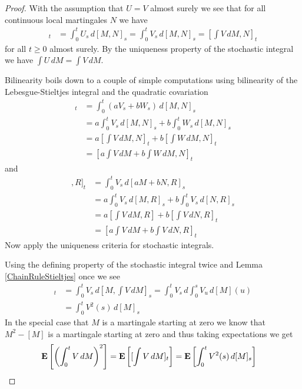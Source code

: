 \begin{proof}
With the assumption that $U = V$ almost surely we see that for all continuous local martingales $N$ we have
\begin{align*}
[\int U \, dM, N]_t &= \int_0^t U_s \, d[M,N]_s = \int_0^t V_s \, d[M,N]_s = [\int V \, dM, N]_t
\end{align*}
for all $t \geq 0$ almost surely.  By the uniqueness property of the stochastic integral we have $\int U \, dM = \int V \, dM$.

Bilinearity boils down to a couple of simple computations using bilinearity of the Lebesgue-Stieltjes integral and the quadratic covariation
\begin{align*}
[\int (aV + bU) \, dM, N]_t &= \int_0^t (aV_s + bW_s) \, d[M,N]_s \\
&= a\int_0^t V_s \, d[M,N]_s + b\int_0^t W_s \, d[M,N]_s \\
&= a[\int V \, dM, N]_t + b[\int W \, dM, N]_t \\
&= [a\int V \, dM + b\int W \, dM, N]_t
\end{align*}
and
\begin{align*}
[\int V \, d[aM + bN], R]_t &= \int_0^t V_s \, d[aM+bN, R]_s \\
&= a\int_0^t V_s \, d[M, R]_s + b\int_0^t V_s \, d[N, R]_s \\
&= a[\int V \, dM, R] + b[\int V \, dN, R]_t \\
&= [a\int V \, dM + b\int V \, dN, R]_t
\end{align*}
Now apply the uniqueness criteria for stochastic integrals.

Using the defining property of the stochastic integral twice and Lemma \ref{ChainRuleStieltjes} once we see
\begin{align*}
[\int V \, dM]_t &= \int_0^t V_s \, d[M, \int V \, dM]_s = \int_0^t V_s \, d\int_0^s V_u \, d[M](u) \\
&= \int_0^t V^2(s) \, d[M]_s
\end{align*}
In the special case that $M$ is a martingale starting at zero we know that $M^2 - [M]$ is a martingale starting at zero and thus taking expectations we get
\begin{align*}
\textbf{E}\left[\left( \int_0^t V \, dM\right)^2\right] &= \textbf{E}\left[[\int V \, dM]_t\right] = \textbf{E}\left[\int_0^t V^2(s) \, d[M]_s\right]
\end{align*}
\end{proof}

